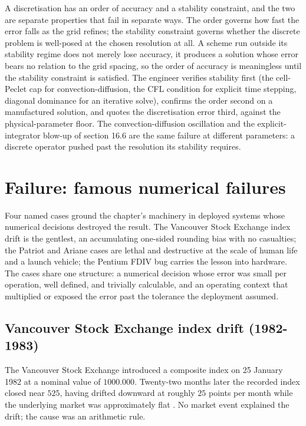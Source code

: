 \begin{principle}
A discretisation has an order of accuracy and a stability constraint, and the
two are separate properties that fail in separate ways. The order governs how
fast the error falls as the grid refines; the stability constraint governs
whether the discrete problem is well-posed at the chosen resolution at all. A
scheme run outside its stability regime does not merely lose accuracy, it
produces a solution whose error bears no relation to the grid spacing, so the
order of accuracy is meaningless until the stability constraint is satisfied.
The engineer verifies stability first (the cell-Peclet cap for convection-diffusion,
the CFL condition for explicit time stepping, diagonal dominance for an
iterative solve), confirms the order second on a manufactured solution, and
quotes the discretisation error third, against the physical-parameter floor.
The convection-diffusion oscillation and the explicit-integrator blow-up of
section 16.6 are the same failure at different parameters: a discrete operator
pushed past the resolution its stability requires.
\end{principle}

\section{Failure: famous numerical failures}

Four named cases ground the chapter's machinery in deployed systems
whose numerical decisions destroyed the result. The Vancouver Stock
Exchange index drift is the gentlest, an accumulating one-sided
rounding bias with no casualties; the Patriot and Ariane cases are
lethal and destructive at the scale of human life and a launch
vehicle; the Pentium FDIV bug carries the lesson into hardware. The
cases share one structure: a numerical decision whose error was
small per operation, well defined, and trivially calculable, and an
operating context that multiplied or exposed the error past the
tolerance the deployment assumed.

\subsection{Vancouver Stock Exchange index drift (1982-1983)}

The Vancouver Stock Exchange introduced a composite index on
25 January 1982 at a nominal value of $1000.000$. Twenty-two months
later the recorded index closed near $525$, having drifted downward
at roughly $25$ points per month while the underlying market was
approximately flat \cite{paper:quinn-vse-1983}. No market event
explained the drift; the cause was an arithmetic rule.

